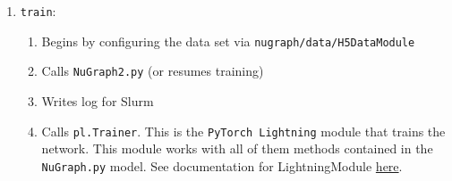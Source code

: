 \begin{itemize}
\begin{enumerate}
            \item \texttt{train}: 
                \begin{enumerate}
                    \item Begins by configuring the data set via \texttt{nugraph/data/H5DataModule}
                    \item Calls \texttt{NuGraph2.py} (or resumes training)
                    \item Writes log for Slurm
                    \item Calls \texttt{pl.Trainer}. This is the \texttt{PyTorch Lightning} module that trains the network. This module works with all of them methods contained in the \texttt{NuGraph.py} model. See documentation for LightningModule \href{https://lightning.ai/docs/pytorch/stable/common/lightning_module.html}{\color{blue} here}.
                \end{enumerate}
        \end{enumerate}


\end{itemize}
